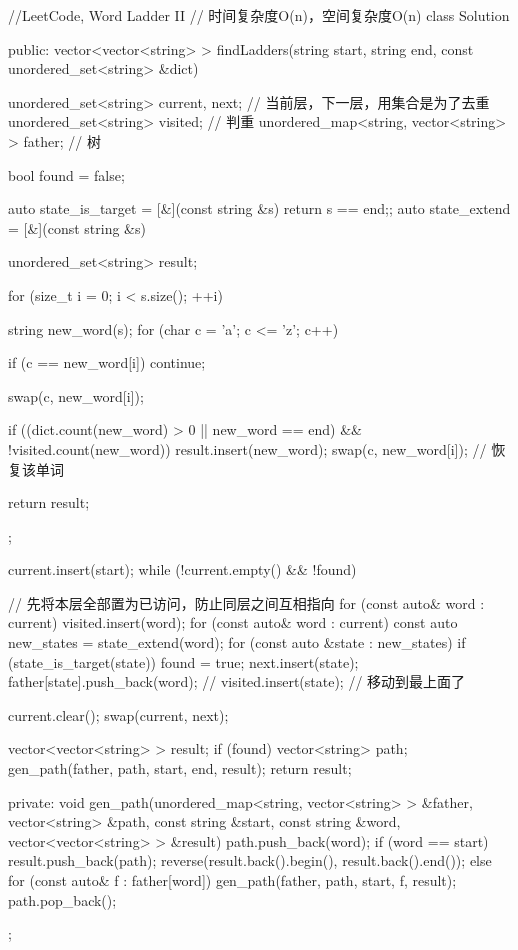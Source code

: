 \begin{Code}
//LeetCode, Word Ladder II
// 时间复杂度O(n)，空间复杂度O(n)
class Solution {
public:
    vector<vector<string> > findLadders(string start, string end,
            const unordered_set<string> &dict) {
        unordered_set<string> current, next;  // 当前层，下一层，用集合是为了去重
        unordered_set<string> visited; // 判重
        unordered_map<string, vector<string> > father; // 树

        bool found = false;

        auto state_is_target = [&](const string &s) {return s == end;};
        auto state_extend = [&](const string &s) {
            unordered_set<string> result;

            for (size_t i = 0; i < s.size(); ++i) {
                string new_word(s);
                for (char c = 'a'; c <= 'z'; c++) {
                    if (c == new_word[i]) continue;

                    swap(c, new_word[i]);

                    if ((dict.count(new_word) > 0 || new_word == end) &&
                             !visited.count(new_word)) {
                        result.insert(new_word);
                    }
                    swap(c, new_word[i]); // 恢复该单词
                }
            }

            return result;
        };

        current.insert(start);
        while (!current.empty() && !found) {
            // 先将本层全部置为已访问，防止同层之间互相指向
            for (const auto& word : current)
                visited.insert(word);
            for (const auto& word : current) {
                const auto new_states = state_extend(word);
                for (const auto &state : new_states) {
                    if (state_is_target(state)) found = true;
                    next.insert(state);
                    father[state].push_back(word);
                    // visited.insert(state); // 移动到最上面了
                }
            }

            current.clear();
            swap(current, next);
        }
        vector<vector<string> > result;
        if (found) {
            vector<string> path;
            gen_path(father, path, start, end, result);
        }
        return result;
    }
private:
    void gen_path(unordered_map<string, vector<string> > &father,
            vector<string> &path, const string &start, const string &word,
            vector<vector<string> > &result) {
        path.push_back(word);
        if (word == start) {
            result.push_back(path);
            reverse(result.back().begin(), result.back().end());
        } else {
            for (const auto& f : father[word]) {
                gen_path(father, path, start, f, result);
            }
        }
        path.pop_back();
    }
};
\end{Code}


